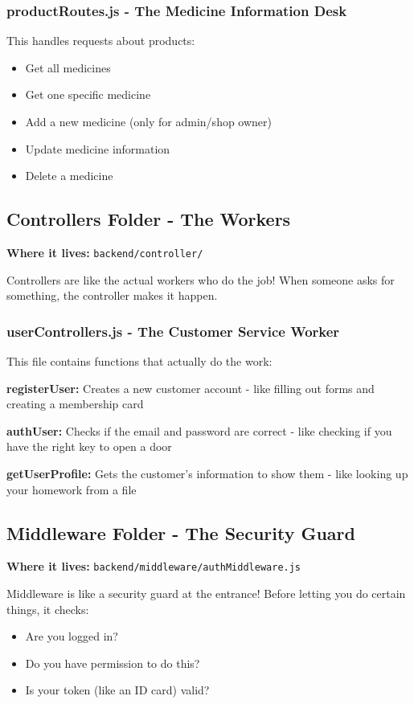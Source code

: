 \documentclass[12pt]{article}
\begin{document}
\subsubsection{productRoutes.js - The Medicine Information Desk}

This handles requests about products:
\begin{itemize}
    \item Get all medicines
    \item Get one specific medicine
    \item Add a new medicine (only for admin/shop owner)
    \item Update medicine information
    \item Delete a medicine
\end{itemize}

\subsection{Controllers Folder - The Workers}

\textbf{Where it lives:} \texttt{backend/controller/}

Controllers are like the actual workers who do the job! When someone asks for something, the controller makes it happen.

\subsubsection{userControllers.js - The Customer Service Worker}

This file contains functions that actually do the work:

\textbf{registerUser:} Creates a new customer account - like filling out forms and creating a membership card

\textbf{authUser:} Checks if the email and password are correct - like checking if you have the right key to open a door

\textbf{getUserProfile:} Gets the customer's information to show them - like looking up your homework from a file

\subsection{Middleware Folder - The Security Guard}

\textbf{Where it lives:} \texttt{backend/middleware/authMiddleware.js}

Middleware is like a security guard at the entrance! Before letting you do certain things, it checks:
\begin{itemize}
    \item Are you logged in?
    \item Do you have permission to do this?
    \item Is your token (like an ID card) valid?
\end{itemize}
\end{document}
